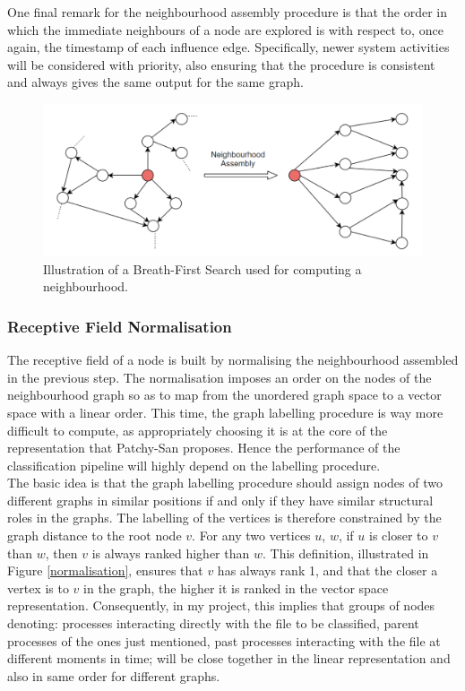 One final remark for the neighbourhood assembly procedure is that the order in which the immediate neighbours of a node are explored is with respect to, once again, the timestamp of each influence edge. Specifically, newer system activities will be considered with priority, also ensuring that the procedure is consistent and always gives the same output for the same graph. \\

\begin{figure}[H]
  \centering
  \includegraphics[scale=0.275]{Images/neighassemb2.png}
  \caption{Illustration of a Breath-First Search used for computing a neighbourhood.}
  \label{neighassemb}
\end{figure}


\subsubsection*{Receptive Field Normalisation}

The receptive field of a node is built by normalising the neighbourhood assembled in the previous step. The normalisation imposes an order on the nodes of the neighbourhood graph so as to map from the unordered graph space to a vector space with a linear order. This time, the graph labelling procedure is way more difficult to compute, as appropriately choosing it is at the core of the representation that Patchy-San proposes. Hence the performance of the classification pipeline will highly depend on the labelling procedure. \\

The basic idea is that the graph labelling procedure should assign nodes of two different graphs in similar positions if and only if they have similar structural roles in the graphs. The labelling of the vertices is therefore constrained by the graph distance to the root node $v$. For any two vertices $u$, $w$, if $u$ is closer to $v$ than $w$, then $v$ is
always ranked higher than $w$. This definition, illustrated in Figure \ref{normalisation}, ensures that $v$ has always rank 1, and that the closer a vertex is to $v$ in the graph, the higher it is ranked in the vector space representation. Consequently, in my project, this implies that groups of nodes denoting: processes interacting directly with the file to be classified, parent processes of the ones just mentioned, past processes interacting with the file at different moments in time; will be close together in the linear representation and also in same order for different graphs.\\

